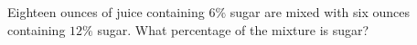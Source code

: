 Eighteen ounces of juice containing $6\%$ sugar are mixed with six ounces containing $12\%$ sugar. What percentage of the mixture is sugar?
